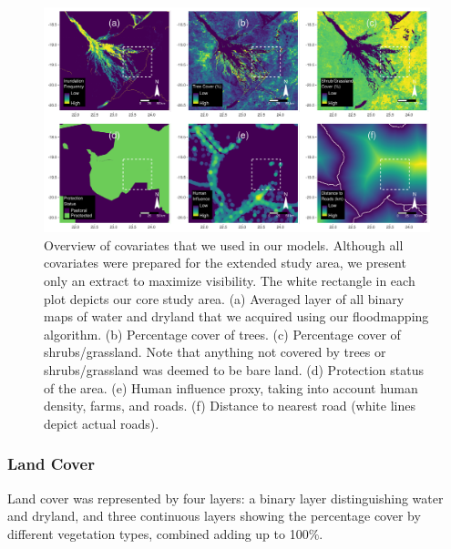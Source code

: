 \documentclass[abstract=on,10pt,a4paper,bibliography=totocnumbered]{scrartcl}
\begin{document}
\begin{figure}[h]
  \begin{center}
    \includegraphics[width = \textwidth]{99_Covariates.pdf}
    \caption{Overview of covariates that we used in our models. Although all
    covariates were prepared for the extended study area, we present only an
    extract to maximize visibility. The white rectangle in each plot depicts our
    core study area. (a) Averaged layer of all binary maps of water and dryland
    that we acquired using our floodmapping algorithm. (b) Percentage cover of
    trees. (c) Percentage cover of shrubs/grassland. Note that anything not
    covered by trees or shrubs/grassland was deemed to be bare land. (d)
    Protection status of the area. (e) Human influence proxy, taking into
    account human density, farms, and roads. (f) Distance to nearest road (white
    lines depict actual roads).}
    \label{Covariates}
  \end{center}
\end{figure}

\newpage
\subsubsection{Land Cover}
Land cover was represented by four layers: a binary layer distinguishing water
and dryland, and three continuous layers showing the percentage cover by
different vegetation types, combined adding up to 100\%.
\end{document}
